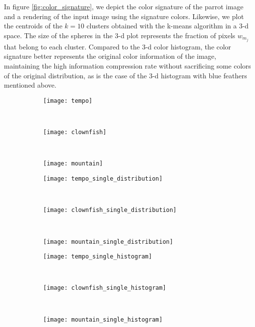 In figure \ref{fig:color_signature}, we depict the color signature of the parrot image and a rendering of the input image using the signature colors. Likewise, we plot the centroids of the $k = 10$ clusters obtained with the k-means algorithm in a 3-d space. The size of the spheres in the 3-d plot represents the fraction of pixels $w_{m_j}$ that belong to each cluster. Compared to the 3-d color histogram, the color signature better represents the original color information of the image, maintaining the high information compression rate without sacrificing some colors of the original distribution, as is the case of the 3-d histogram with blue feathers mentioned above. 

\begin{figure}[!ht]
    \centering
    \begin{subfigure}[t]{\textwidth+20pt\relax}
    	\texttt{[image: tempo]}
    \end{subfigure}~ 
    \begin{subfigure}[b]{0.32\textwidth}
        \texttt{[image: clownfish]}
    \end{subfigure}~
    \begin{subfigure}[b]{0.32\textwidth}
        \texttt{[image: mountain]}
    \end{subfigure}\vspace{5pt}
    
    
    \begin{subfigure}[t]{\textwidth+20pt\relax}
    	\texttt{[image: tempo\_single\_distribution]}
    \end{subfigure}~     
    \begin{subfigure}[b]{0.32\textwidth}
        \texttt{[image: clownfish\_single\_distribution]}
    \end{subfigure}~
    \begin{subfigure}[b]{0.32\textwidth}
        \texttt{[image: mountain\_single\_distribution]}
    \end{subfigure}%
    
    
    \begin{subfigure}[t]{\textwidth+20pt\relax}
    	\texttt{[image: tempo\_single\_histogram]}
    \end{subfigure}~     
    \begin{subfigure}[b]{0.32\textwidth}
        \texttt{[image: clownfish\_single\_histogram]}
    \end{subfigure}~
    \begin{subfigure}[b]{0.32\textwidth}
        \texttt{[image: mountain\_single\_histogram]}
    \end{subfigure}%
    

\end{figure}
